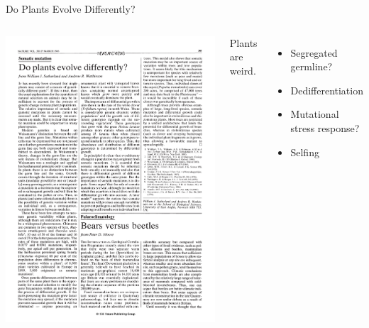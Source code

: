 \documentclass{beamer}
\begin{document}
\begin{frame}{Do Plants Evolve Differently?}
	\begin{columns}
		\begin{alertblock}{}
			\includegraphics[trim={1.2cm 19cm 13.5cm 6.95cm},clip,width=\linewidth]{do_plants_evolve_differently.pdf}
		\end{alertblock}
		Plants are weird.
		\begin{itemize}
			\item Segregated germline?
			\item Dedifferentiation
			\item Mutational stress response?
			\item Selfing
		\end{itemize}


	\end{columns}




\end{frame}
\end{document}
